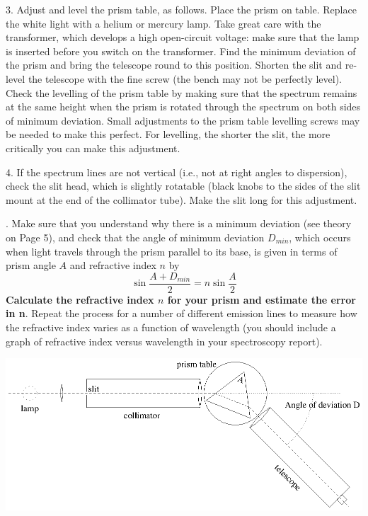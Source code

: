 \documentclass[12pt]{article}
\begin{document}
3. Adjust and level the prism table, as follows.  Place the prism on table.
Replace the white light with a helium or mercury lamp.
Take great care with the  transformer, which develops a high
open-circuit voltage: make sure that the lamp is  inserted before you
switch on the transformer.  Find the minimum deviation of the prism and bring the
telescope round to this position. Shorten the slit and re-level the
telescope with the fine screw (the bench may not be perfectly level).
Check the levelling of the prism table  by making sure that the
spectrum remains at the same height  when the prism is
rotated through the spectrum on both sides of minimum deviation.
Small  adjustments to the prism table levelling screws may be needed
to make this perfect.   For levelling, the shorter the slit, the more
critically you can make this adjustment.

4. If the spectrum lines are not vertical  (i.e., not at right angles
to dispersion), check  the slit head, which is slightly rotatable
(black knobs to the sides of the slit mount at the end of the collimator
tube).  Make the slit long for this adjustment.

. Make sure that you understand why there is a minimum deviation (see
theory on Page 5), and check that the angle of 
minimum deviation $D_{min}$, which occurs when light travels through the 
prism parallel to its base, is given in terms of 
prism angle $A$ and refractive index $n$ by 
\[  \sin \frac{A+D_{min}}{2} = n \sin \frac{A}{2}   \] {\bf Calculate the 
refractive index $n$ for your prism and estimate the error in n}. 
Repeat the process for a number of different emission lines to measure 
how the refractive index varies as a function of wavelength (you should include a graph of 
refractive index versus wavelength in your spectroscopy report).
\begin{center}
\includegraphics{ap3labspec1.ps}
\end{center}
\end{document}
